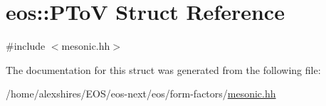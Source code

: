 \hypertarget{structeos_1_1PToV}{
\section{eos::PToV Struct Reference}
\label{structeos_1_1PToV}
}


{\ttfamily \#include $<$mesonic.hh$>$}

The documentation for this struct was generated from the following file:\begin{DoxyCompactItemize}
\item 
/home/alexshires/EOS/eos-\/next/eos/form-\/factors/\hyperlink{mesonic_8hh}{mesonic.hh}\end{DoxyCompactItemize}
